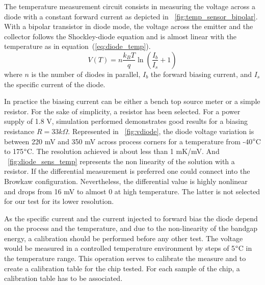 The temperature measurement circuit consists in measuring the voltage across a diode with a constant forward current as depicted in \figurename~\ref{fig:temp_sensor_bipolar}. With a bipolar transistor in diode mode, the voltage across the emitter and the collector follows the Shockley-diode equation and is almost linear with the temperature as in equation~(\ref{eq:diode_temp}). 
\begin{equation}
    \label{eq:diode_temp}
    V(T) = n \frac{k_BT}{q}\ln\left(\frac{I_b}{I_s}+1 \right)
\end{equation}
where $n$ is the number of diodes in parallel, $I_b$ the forward biasing current, and $I_s$ the specific current of the diode.

In practice the biasing current can be either a bench top source meter or a simple resistor. For the sake of simplicity, a resistor has been selected. For a power supply of 1.8 V, simulation performed demonstrates good results for a biasing resistance $R = 33 k\Omega$. Represented in \figurename~\ref{fig:vdiode}, the diode voltage variation is between 220 mV and 350 mV across process corners for a temperature from -40\(\degree\)C to 175\(\degree\)C. The resolution achieved is about less than 1 mK/mV. And \figurename~\ref{fig:diode_sens_temp} represents the non linearity of the solution with a resistor. If the differential measurement is preferred one could connect into the Browkaw configuration. Nevertheless, the differential value is highly nonlinear and drops from 16 mV to almost 0 at high temperature. The latter is not selected for our test for its lower resolution.

As the specific current and the current injected to forward bias the diode depend on the process and the temperature, and due to the non-linearity of the bandgap energy, a calibration should be performed before any other test. The voltage would be measured in a controlled temperature environment by steps of 5\(\degree\)C in the temperature range. This operation serves to calibrate the measure and to create a calibration table for the chip tested. For each sample of the chip, a calibration table has to be associated.

